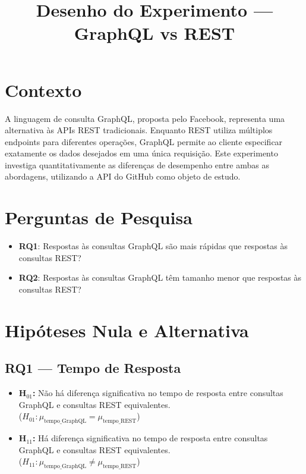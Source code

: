 \documentclass[12pt, a4paper]{article}
\title{Desenho do Experimento — GraphQL vs REST}
\author{}
\date{}
\begin{document}
\maketitle

\section{Contexto}

A linguagem de consulta GraphQL, proposta pelo Facebook, representa uma alternativa às APIs REST tradicionais. Enquanto REST utiliza múltiplos endpoints para diferentes operações, GraphQL permite ao cliente especificar exatamente os dados desejados em uma única requisição. Este experimento investiga quantitativamente as diferenças de desempenho entre ambas as abordagens, utilizando a API do GitHub como objeto de estudo.

\section{Perguntas de Pesquisa}

\begin{itemize}
    \item \textbf{RQ1}: Respostas às consultas GraphQL são mais rápidas que respostas às consultas REST?
    \item \textbf{RQ2}: Respostas às consultas GraphQL têm tamanho menor que respostas às consultas REST?
\end{itemize}

\section{Hipóteses Nula e Alternativa}

\subsection{RQ1 — Tempo de Resposta}
\begin{itemize}
    \item \textbf{H$_{01}$:} Não há diferença significativa no tempo de resposta entre consultas GraphQL e consultas REST equivalentes.\\
    ($H_{01}: \mu_{\text{tempo\_GraphQL}} = \mu_{\text{tempo\_REST}}$)
    \item \textbf{H$_{11}$:} Há diferença significativa no tempo de resposta entre consultas GraphQL e consultas REST equivalentes.\\
    ($H_{11}: \mu_{\text{tempo\_GraphQL}} \neq \mu_{\text{tempo\_REST}}$)
\end{itemize}
\end{document}
